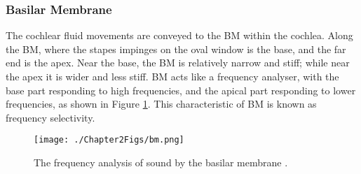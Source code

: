 \documentclass[11pt]{article}
\begin{document}

\subsubsection{Basilar Membrane}
\label{sec-2-3-1}
\label{sec:ch2-basilar-membrane}

The cochlear fluid movements are conveyed to the BM within the
cochlea. Along the BM, where the stapes impinges on the oval window is
the base, and the far end is the apex. Near the base, the
BM is relatively narrow and stiff; while near the apex it is wider and
less stiff. BM acts like a frequency analyser, with the base part
responding to high frequencies, and the apical part responding to
lower frequencies, as shown in Figure \ref{fig:bm}. This
characteristic of BM is known as frequency selectivity.

\begin{figure}[htb]
\centering
\texttt{[image: ./Chapter2Figs/bm.png]}
\caption{\label{fig:bm}The frequency analysis of sound by the basilar membrane \cite{BritannicaBMfreq}.}
\end{figure}
\end{document}

